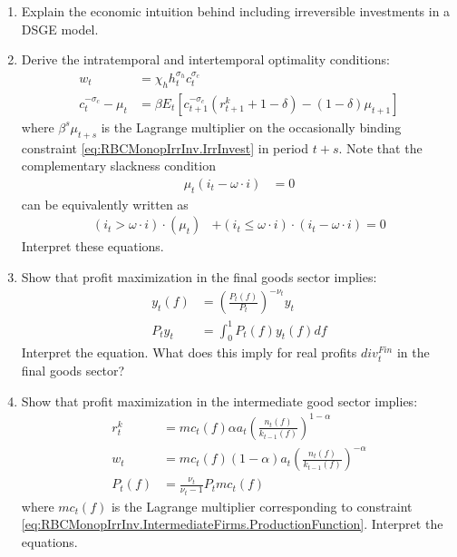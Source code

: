 \documentclass{article}
\begin{document}
\begin{enumerate}

\item Explain the economic intuition behind including irreversible investments in a DSGE model.

\item Derive the intratemporal and intertemporal optimality conditions:
\begin{align}
w_t &= \chi_h h_t^{\sigma_h} c_t^{\sigma_c} \label{eq:RBCMonopIrrInv.LaborSupply}
\\
c_t^{-\sigma_c} - \mu_t &= \beta E_t \left[ c_{t+1}^{-\sigma_c} \left( r^k_{t+1} + 1-\delta \right) - (1-\delta) \mu_{t+1}\right]
\label{eq:RBCMonopIrrInv.EulerCapital}
\end{align}
where $\beta^s \mu_{t+s}$ is the Lagrange multiplier on the occasionally binding constraint \eqref{eq:RBCMonopIrrInv.IrrInvest} in period $t+s$.
Note that the complementary slackness condition
\begin{align*}
\mu_t (i_t - \omega \cdot i) &= 0
\end{align*}
can be equivalently written as
\begin{align}
(i_t > \omega \cdot i) \cdot (\mu_t) &+ (i_t \leq \omega \cdot i) \cdot (i_t - \omega \cdot i) = 0  \label{eq:RBCMonopIrrInv.KuhnTuckerInvestment}
\end{align}
Interpret these equations.

\item Show that profit maximization in the final goods sector implies:
\begin{align}
y_t(f) &= \left(\frac{P_t(f)}{P_t}\right)^{-\nu_t} y_t \label{eq:RBCMonopIrrInv.Firms.Demand}
\\
P_t y_t &= \int_{0}^{1} P_t(f) y_t(f) df \label{eq:RBCMonopIrrInv.Firms.ZeroProfit}
\end{align}
Interpret the equation.
What does this imply for real profits $div_t^{Fin}$ in the final goods sector?


\item Show that profit maximization in the intermediate good sector implies:
\begin{align}
r^k_t  &= mc_t(f) \alpha a_t \left( \frac{n_t(f)}{k_{t-1}(f)}\right)^{1-\alpha}
\label{eq:RBCMonopIrrInv.IntermediateFirms.CapitalDemand}
\\
w_t  &= mc_t(f) (1-\alpha) a_t \left(\frac{n_t(f)}{k_{t-1}(f)}\right)^{-\alpha}
\label{eq:RBCMonopIrrInv.IntermediateFirms.LaborDemand}
\\
P_t(f) &= \frac{\nu_t}{\nu_t - 1} P_t mc_t(f) \label{eq:RBCMonopIrrInv.IntermediateFirms.Price}
\end{align}
where $mc_t(f)$ is the Lagrange multiplier corresponding to constraint \eqref{eq:RBCMonopIrrInv.IntermediateFirms.ProductionFunction}.
Interpret the equations.


\end{enumerate}
\end{document}
